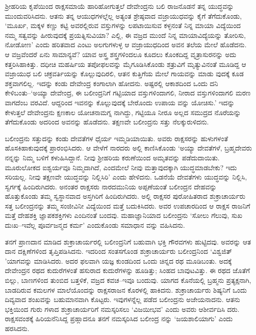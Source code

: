ಶ್ರೀಹರಿಯ ಕೃಪೆಯಿಂದ ರಾಕ್ಷಸಮಾಯೆ ಹಾರಿಹೋಗುತ್ತಲೆ ದೇವೇಂದ್ರನು ಬಲಿ ರಾಜನೊಡನೆ ತನ್ನ ಯುದ್ಧವನ್ನು ಮುಂದುವರಿಸಿದನು. ಆತನು ತನ್ನ ಆಯುಧಗಳಲ್ಲೆಲ್ಲ ಅತ್ಯಂತ ಶ್ರೇಷ್ಠವಾದ ವಜ್ರಾಯುಧವನ್ನು ಕೈಗೆ ತೆಗೆದುಕೊಂಡು, ‘ಮೂರ್ಖ, ಮಕ್ಕಳ ಕಣ್ಣು ಕಟ್ಟಿ ಅವರಲ್ಲಿರುವ ವಸ್ತುಗಳನ್ನು ಲಪಟಾಯಿಸುವ ಕಳ್ಳನಂತೆ ನಿನ್ನ ಮಾಯಾ ವಿದ್ಯೆಯಿಂದ ನಮ್ಮ ಸತ್ವವನ್ನು ಹೀರುವುದಕ್ಕೆ ಪ್ರಯತ್ನಿಸುವಿಯಾ? ಎಲ್ಲಿ, ಈ ವಜ್ರದ ಮುಂದೆ ನಿನ್ನ ಮಾಯಾವಿದ್ಯೆಯನ್ನು ತೋರಿಸು, ನೋಡೋಣ’ ಎಂದು ಹರಿತವಾದ ಎಂಟು ಅಲಗುಗಳುಳ್ಳ ಆ ವಜ್ರಾಯುಧದಿಂದ ಅವನ ತಲೆಯ ಮೇಲೆ ಹೊಡೆದನು. ಆ ವಜ್ರವೆಂದರೆ ಏನು ಸಾಮಾನ್ಯವೆ? ಯಾವ ಅಸ್ತ್ರ ಶಸ್ತ್ರಗಳಿಂದಲೂ ಕೂದಲು ಕೊಂಕದಿದ್ದ ವೃತ್ರಾಸುರನನ್ನು ಅದು ಕತ್ತರಿಸಿಹಾಕಿತ್ತು. ದಧೀಚಿ ಮಹರ್ಷಿಯ ತಪೋಫಲವನ್ನು ಮೈಗೂಡಿಸಿಕೊಂಡು ಶತ್ರುವಿಗೆ ಮೃತ್ಯುವಿನಂತೆ ಮೂಡಿದ್ದ ಆ ವಜ್ರಾಯುಧ ಬಲಿ ಚಕ್ರವರ್ತಿಯನ್ನು ಕೊಲ್ಲುವುದಿರಲಿ, ಆತನ ಕುತ್ತಿಗೆಯ ಮೇಲೆ ಗಾಯವನ್ನು ಮಾಡು ವುದಕ್ಕೆ ಕೂಡ ಶಕ್ತವಾಗಲಿಲ್ಲ. ಇದನ್ನು ಕಂಡು ದೇವೇಂದ್ರ ಕಂಗಾಲಾಗಿ ಹೋದನು. ಅಷ್ಟರಲ್ಲಿ ಆಕಾಶದಿಂದ ಒಂದು ದನಿ ಕೇಳಿಬಂತು–‘ಅಯ್ಯಾ ದೇವೇಂದ್ರ, ಈ ಬಲೀಂದ್ರನಿಗೆ ಗಟ್ಟಿಯಾದ ವಸ್ತುಗಳಿಂದಾಗಲಿ, ನೀರಾದ ವಸ್ತುಗಳಿಂದಾಗಲಿ ಮರಣ ವಾಗದೆಂಬ ವರವಿದೆ. ಆದ್ದರಿಂದ ಇವನನ್ನು ಕೊಲ್ಲುವುದಕ್ಕೆ ಬೇರೊಂದು ಉಪಾಯ ವನ್ನು ಯೋಚಿಸು.’ ಇದನ್ನು ಕೇಳುತ್ತಲೆ ದೇವೇಂದ್ರನು ಕ್ಷಣಕಾಲ ಯೋಚನಾಮಗ್ನ ನಾಗಿದ್ದು, ಗಟ್ಟಿಯೂ ನೀರೂ ಅಲ್ಲದ ಸಮುದ್ರದ ನೊರೆಯನ್ನು ತೆಗೆದುಕೊಂಡು ಅದರಿಂದ ಅವನನ್ನು ಹೊಡೆದನು. ತಕ್ಷಣವೇ ಬಲೀಂದ್ರನು ಸತ್ತು ನೆಲಕ್ಕುರುಳಿದನು.

ಬಲೀಂದ್ರನು ಸತ್ತುದನ್ನು ಕಂಡು ದೇವತೆಗಳ ಧೈರ್ಯ ಇಮ್ಮಡಿಯಾಯಿತು. ಅವರು ರಾಕ್ಷಸರನ್ನು ಹುಳುಗಳಂತೆ ಹೊಸಕಿಹಾಕುವುದಕ್ಕೆ ಪ್ರಾರಂಭಿಸಿದರು. ಆ ವೇಳೆಗೆ ನಾರದರು ಅಲ್ಲಿ ಕಾಣಿಸಿಕೊಂಡು ‘ಅಯ್ಯಾ ದೇವತೆಗಳೆ, ಬ್ರಹ್ಮದೇವರು ನನ್ನನ್ನು ನಿಮ್ಮ ಬಳಿಗೆ ಕಳುಹಿಸಿದ್ದಾನೆ. ನೀವು ಶ್ರೀಹರಿಯ ಕರುಣೆಯಿಂದ ಅಮೃತವನ್ನು ಪಡೆದುದಾಯಿತು. ಮೂರುಲೋಕದ ಐಶ್ವರ್ಯವೂ ನಿಮ್ಮದಾಗಿದೆ, ಎಂದಮೇಲೆ ನೀವು ಮತ್ತಾವುದಕ್ಕಾಗಿ ಯುದ್ಧಮಾಡಬೇಕು? ಇದು ಸರಿಯಲ್ಲ. ನೀವು ತಕ್ಷಣವೇ ಯುದ್ಧವನ್ನು ನಿಲ್ಲಿಸಿರಿ’ ಎಂದು ಹೇಳಿದನು. ಒಡನೆಯೆ ದೇವತೆಗಳು ಯುದ್ಧವನ್ನು ನಿಲ್ಲಿಸಿ, ಸ್ವರ್ಗಕ್ಕೆ ಹಿಂದಿರುಗಿದರು. ಅನಂತರ ರಾಕ್ಷಸರು ನಾರದಮುನಿಯ ಅಪ್ಪಣೆಯಂತೆ ಬಲೀಂದ್ರನ ದೇಹವನ್ನು ಹೊತ್ತುಕೊಂಡು ತಮ್ಮ ಸ್ವಸ್ಥಾನವಾದ ಅಸ್ತಗಿರಿಗೆ ಹಿಂದಿರುಗಿದರು. ಅಲ್ಲಿ ರಾಕ್ಷಸರ ಪುರೋಹಿತರಾದ ಶುಕ್ರಾಚಾರ್ಯರು ಸತ್ತ ಬಲೀಂದ್ರನನ್ನು ತಮ್ಮ ಸಂಜೀವಿನೀ ವಿದ್ಯೆಯಿಂದ ಮತ್ತೆ ಬದುಕಿಸಿದರು. ಅವರ ಉಪಚಾರದಿಂದ ಆ ರಾಕ್ಷಸ ರಾಜನಿಗೆ ಮತ್ತೆ ದೇಹಶಕ್ತಿ ಜ್ಞಾಪಕಶಕ್ತಿಗಳು ಎಂದಿನಂತೆ ಬಂದವು. ಮಹಾಜ್ಞಾನಿಯಾದ ಬಲೀಂದ್ರನು ‘ಸೋಲು ಗೆಲುವು, ಸುಖ ದುಃಖ–ಇವೆಲ್ಲ ಪೂರ್ವಜನ್ಮದ ಕರ್ಮ’ ಎಂದುಕೊಂಡು ಸಮಾಧಾನ ವನ್ನು ವಹಿಸಿದನು.

ತನಗೆ ಪ್ರಾಣದಾನ ಮಾಡಿದ ಶುಕ್ರಾಚಾರ್ಯರಲ್ಲಿ ಬಲೀಂದ್ರನಿಗೆ ಬಹುವಾಗಿ ಭಕ್ತಿ ಗೌರವಗಳು ಹುಟ್ಟಿದವು. ಅವರನ್ನು ಆತ ದಾನ ದಕ್ಷಿಣೆಗಳಿಂದ ತೃಪ್ತಿಪಡಿಸಿದನು. ಇದರಿಂದ ಸಂತಸಗೊಂಡ ಶುಕ್ರಾಚಾರ್ಯರು ಬಲೀಂದ್ರನಿಂದ ‘ವಿಶ್ವಜಿತ್​’ಯಾಗವನ್ನು ಮಾಡಿಸಿದರು. ಅದರ ಫಲವಾಗಿ ಯಜ್ಞ ಕುಂಡದಿಂದ ಒಂದು ಚಿನ್ನದ ರಥ ಮೂಡಿಬಂತು. ಅದಕ್ಕೆ ದೇವೇಂದ್ರನ ರಥದ ಕುದುರೆಗಳಂತೆ ಹಸುರಾದ ಕುದುರೆಗಳನ್ನು ಹೂಡಿತ್ತು; ಸಿಂಹದ ಬಾವುಟವಿತ್ತು. ಈ ರಥದ ಜೊತೆಗೆ ಬಿಲ್ಲು, ಬಾಣಗಳಿಂದ ತುಂಬಿದ ಬತ್ತಳಿಕೆ, ವಜ್ರದ ಕವಚ–ಇವೂ ಬಂದುವು. ಯಾಗದ ಕೊನೆಯಲ್ಲಿ ಬ್ರಹ್ಮನು ಪ್ರತ್ಯಕ್ಷನಾಗಿ, ಬಾಡದಿರುವ ಕಮಲಗಳ ಮಾಲೆಯೊಂದನ್ನು ರಾಕ್ಷಸರಾಜನ ಕೊರಳಲ್ಲಿ ಹಾಕಿದನು. ಶುಕ್ರಾಚಾರ್ಯರು ಶಿಷ್ಯನಿಗೆ ಒಂದು ದಿವ್ಯವಾದ ಶಂಖವನ್ನು ಬಹುಮಾನವಾಗಿ ಕೊಟ್ಟರು. ಇವುಗಳನ್ನೆಲ್ಲ ಪಡೆದ ಬಲೀಂದ್ರನು ಅಜೇಯನಾದನು. ಆತನು ಭಕ್ತಿಯಿಂದ ಗುರು ಗಳಾದ ಶುಕ್ರಾಚಾರ್ಯರಿಗೆ ನಮಸ್ಕರಿಸಲು ‘ವಿಜಯೀಭವ’ ಎಂದು ಅವರು ಆಶೀರ್ವದಿಸಿ ದರು. ರಾಕ್ಷಸವಂಶಕ್ಕೆ ಹಿರಿಯನೆನಿಸಿದ್ದ ಪ್ರಹ್ಲಾದನೂ ತನಗೆ ನಮಸ್ಕರಿಸಿದ ಬಲೀಂದ್ರ ನನ್ನು ‘ಜಯಶಾಲಿಯಾಗು’ ಎಂದು ಹರಸಿದನು. 

